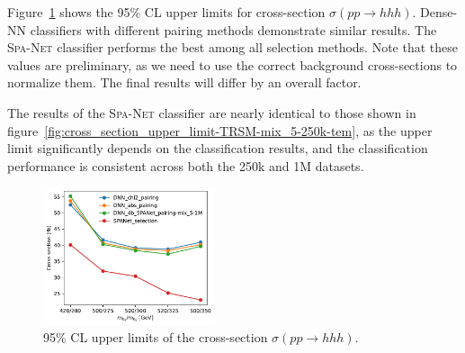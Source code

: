 \documentclass[12pt]{article}
\begin{document}
        Figure~\ref{fig:cross_section_upper_limit-TRSM-mix_5-1M-tem} shows the 95\% CL upper limits for cross-section $\sigma\left( pp \to hhh \right)$. Dense-NN classifiers with different pairing methods demonstrate similar results. The \textsc{Spa-Net} classifier performs the best among all selection methods. Note that these values are preliminary, as we need to use the correct background cross-sections to normalize them. The final results will differ by an overall factor.

        The results of the \textsc{Spa-Net} classifier are nearly identical to those shown in figure~\ref{fig:cross_section_upper_limit-TRSM-mix_5-250k-tem}, as the upper limit significantly depends on the classification results, and the classification performance is consistent across both the 250k and 1M datasets.
        \begin{figure}[htpb]
            \centering
            \includegraphics[width=0.45\textwidth]{cross_section_upper_limit-TRSM-mix_5-1M.pdf}
            \caption{95\% CL upper limits of the cross-section $\sigma\left( pp \to hhh \right)$.}
            \label{fig:cross_section_upper_limit-TRSM-mix_5-1M-tem}
        \end{figure}


\end{document}
